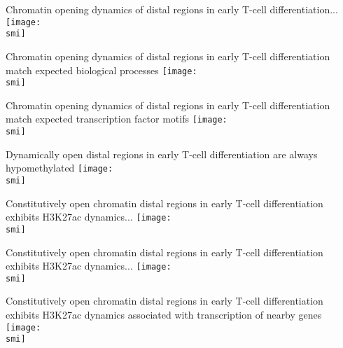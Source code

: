 \documentclass[10pt]{beamer}
\def\smi{out/ln/updir/mw-gcthesis-oral/library.bib}
\begin{document}
\begin{frame}{Chromatin opening dynamics of distal regions in early T-cell differentiation...}
  \def\smi{out/ln/updir/mw-gcthesis-oral/ink/atac-clusters/atac.pdf}
  \texttt{[image: \\smi]}
\end{frame}
\begin{frame}{Chromatin opening dynamics of distal regions in early T-cell differentiation match expected biological processes} 
  \def\smi{out/ln/updir/mw-gcthesis-oral/ink/atac-clusters/atac-gobp.pdf}
  \texttt{[image: \\smi]}
\end{frame}
\begin{frame}{Chromatin opening dynamics of distal regions in early T-cell differentiation match expected transcription factor motifs} 
  \def\smi{out/ln/updir/mw-gcthesis-oral/ink/atac-clusters/atac-motifs.pdf}
  \texttt{[image: \\smi]}
\end{frame}
\begin{frame}{Dynamically open distal regions in early T-cell differentiation are always hypomethylated}
  \def\smi{out/ln/updir/mw-gcthesis-oral/ink/atac-clusters/atac-wgbs.pdf}
  \texttt{[image: \\smi]}
\end{frame}
\begin{frame}{Constitutively open chromatin distal regions in early T-cell differentiation exhibits H3K27ac dynamics...}
  \def\smi{out/ln/updir/mw-gcthesis-oral/ink/atac-clusters/atac-wgbs-h3k27ac.pdf}
  \texttt{[image: \\smi]}
\end{frame}
\begin{frame}{Constitutively open chromatin distal regions in early T-cell differentiation exhibits H3K27ac dynamics...}
  \def\smi{out/ln/updir/mw-gcthesis-oral/ink/atac-clusters/h3k27ac.pdf}
  \texttt{[image: \\smi]}
\end{frame}
\begin{frame}{Constitutively open chromatin distal regions in early T-cell differentiation exhibits H3K27ac dynamics associated with transcription of nearby genes}
  \def\smi{out/ln/updir/mw-gcthesis-oral/ink/atac-clusters/rnaseq-h3k27ac-no-casero.pdf}
  \texttt{[image: \\smi]}
\end{frame}
\end{document}
